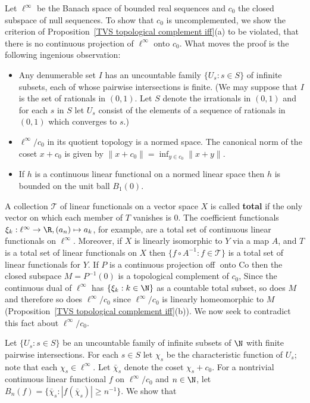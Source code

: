 \begin{example}\label{TVS uncomplemented eg}
Let $\ell^\infty$ be the Banach space of bounded real sequences and $c_0$ the closed subspace of null sequences. To show that $c_0$ is uncomplemented, we show the criterion of Proposition~\ref{TVS topological complement iff}(a) to be violated, that there is no continuous projection of $\ell^\infty$ onto $c_0$. What moves the proof is the following ingenious observation:
\begin{itemize}
\item Any denumerable set $I$ has an uncountable family $\{U_s:s\in S\}$ of infinite subsets, each of whose pairwise intersections is finite. (We may suppose that $I$ is the set of rationals in $(0,1)$. Let $S$ denote the irrationals in $(0,1)$ and for each $s$ in $S$ let $U_s$ consist of the elements of a sequence of rationals in $(0,1)$ which converges to $s$.)
\item $\ell^\infty/c_0$ in its quotient topology is a normed space. The canonical norm of the coset $x+c_0$ is given by $\|x+c_0\|=\inf_{y\in c_0}\|x+y\|$.
\item If $h$ is a continuous linear functional on a normed linear space then $h$ is bounded on the unit ball $B_1(0)$.
\end{itemize}
A collection $\mathscr{T}$ of linear functionals on a vector space $X$ is called \textbf{total} if the only vector on which each member of $T$ vanishes is $0$. The coefficient functionals $\xi_k:\ell^\infty\to\R,(a_n)\mapsto a_k$, for example, are a total set of continuous linear functionals on $\ell^\infty$. Moreover, if $X$ is linearly isomorphic to $Y$ via a map $A$, and $T$ is a total set of linear functionals on $X$ then $\{f\circ A^{-1}:f\in\mathscr{T}\}$ is a total set of linear functionals for $Y$. If $P$ is a continuous projection off􀁣 onto Co then the closed subspace $M=P^{-1}(0)$ is a topological complement of $c_0$, Since the continuous dual of $\ell^\infty$ has $\{\xi_k:k\in\N\}$ as a countable total subset, so does $M$ and therefore so does $\ell^\infty/c_0$ since $\ell^\infty/c_0$ is linearly homeomorphic to $M$ (Proposition~\ref{TVS topological complement iff}(b)). We now seek to contradict this fact about $\ell^\infty/c_0$.\par
Let $\{U_s:s\in S\}$ be an uncountable family of infinite subsets of $\N$ with finite pairwise intersections. For each $s\in S$ let $\chi_s$ be the characteristic function of $U_s$; note that each $\chi_s\in\ell^\infty$. Let $\bar{\chi}_s$ denote the coset $\chi_s+c_0$. For a nontrivial continuous linear functional $f$ on $\ell^\infty/c_0$ and $n\in\N$, let $B_n(f)=\{\bar{\chi}_s:|f(\bar{\chi}_s)|\geq n^{-1}\}$. We show that

\end{example}
